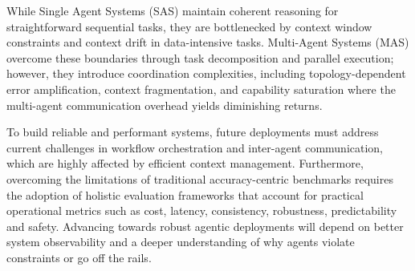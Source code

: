\documentclass[conference]{IEEEtran}
\begin{document}
While Single Agent Systems (SAS) maintain coherent reasoning for straightforward sequential tasks, 
they are bottlenecked by context window constraints and context drift in data-intensive tasks. 
Multi-Agent Systems (MAS) overcome these boundaries through task decomposition and parallel execution; 
however, they introduce coordination complexities, 
including topology-dependent error amplification, context fragmentation, 
and capability saturation where the multi-agent communication overhead yields diminishing returns.

To build reliable and performant systems, future deployments must address current challenges
in workflow orchestration and inter-agent communication, which are highly affected by
efficient context management. 
Furthermore, overcoming the limitations of traditional accuracy-centric benchmarks requires 
the adoption of holistic evaluation frameworks that account for practical operational metrics such as cost, 
latency, consistency, robustness, predictability and safety. 
Advancing towards robust agentic deployments 
will depend on better system observability and a deeper understanding of why agents violate constraints
or go off the rails.



\end{document}
